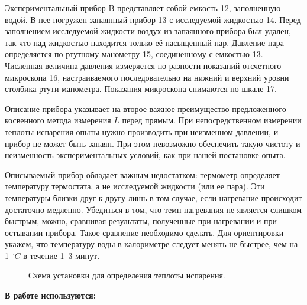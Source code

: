 \documentclass[a4paper, 12pt]{article}%
\begin{document}
	Экспериментальный прибор B представляет собой емкость 12, заполненную водой. В нее погружен запаянный прибор 13 с исследуемой жидкостью 14. Перед заполнением исследуемой жидкости воздух из запаянного прибора был удален, так что над жидкостью находится только её насыщенный пар. Давление пара определяется по ртутному манометру 15, соединенному с емкостью 13. Численная величина давления измеряется по разности показаний отсчетного микроскопа 16, настраиваемого последовательно на нижний и верхний уровни столбика ртути манометра. Показания микроскопа снимаются по шкале 17.
	
	Описание прибора указывает на второе важное преимущество предложенного косвенного метода измерения $ L $ перед прямым. При непосредственном измерении теплоты испарения опыты нужно производить при неизменном давлении, и прибор не может быть запаян. При этом невозможно обеспечить такую чистоту и неизменность экспериментальных условий, как при нашей постановке опыта.
	
	Описываемый прибор обладает важным недостатком: термометр определяет температуру термостата, а не исследуемой жидкости (или ее пара). Эти температуры близки друг к другу лишь в том случае, если нагревание происходит достаточно медленно. Убедиться в том, что темп нагревания не является слишком быстрым, можно, сравнивая результаты, полученные при нагревании и при остывании прибора. Такое сравнение необходимо сделать. Для ориентировки укажем, что температуру воды в калориметре следует менять не быстрее, чем на 1 $ ^\circ C $ в течение 1–3 минут.
	\begin{figure}[H]
		\caption{Схема установки для определения теплоты испарения.}
	\end{figure}
	
	\textbf{В работе используются:}\\
	
\end{document}
